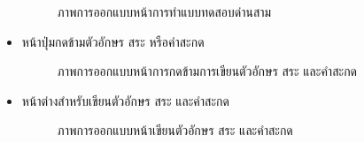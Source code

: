 \documentclass[12pt,oneside,openright,a4paper]{cpe-thai-project}
\begin{document}
\begin{itemize}
\begin{figure}[!ht]
    \caption{ภาพการออกแบบหน้าการทำแบบทดสอบด่านสาม}\label{fig:system}
  \end{figure}
  \item หน้าปุ่มกดข้ามตัวอักษร สระ หรือคำสะกด
  \begin{figure}[!ht]\centering
    \setlength{\fboxrule}{0.2mm} %
    \setlength{\fboxsep}{1cm}
    \caption{ภาพการออกแบบหน้าการกดข้ามการเขียนตัวอักษร สระ และคำสะกด}\label{fig:system}
  \end{figure}
  \newpage
  \item หน้าต่างสำหรับเขียนตัวอักษร สระ และคำสะกด
  \begin{figure}[!ht]\centering
    \setlength{\fboxrule}{0.2mm} %
    \setlength{\fboxsep}{1cm}
    \caption{ภาพการออกแบบหน้าเขียนตัวอักษร สระ และคำสะกด}\label{fig:system}
  \end{figure}
  \begin{figure}[!ht]\centering
    \setlength{\fboxrule}{0.2mm} %

\end{figure}
\end{itemize}
\end{document}
